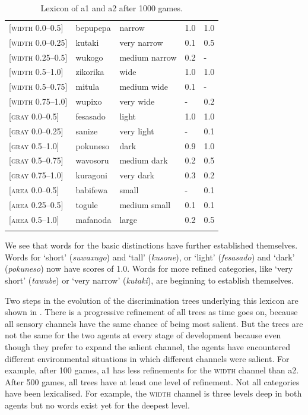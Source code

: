 \begin{table}
\begin{center}
\begin{tabular}{ l  l  l  l  l }
\lsptoprule
{}[\textsc{width} 0.0–0.5]&bepupepa&narrow & 1.0&1.0\\ 
{}[\textsc{width} 0.0–0.25]&kutaki&very narrow & 0.1&0.5\\ 
{}[\textsc{width} 0.25–0.5]&wukogo&medium narrow & 0.2&-\\ 
{}[\textsc{width} 0.5–1.0]&zikorika&wide & 1.0&1.0\\ 
{}[\textsc{width} 0.5–0.75]&mitula&medium wide &0.1&-\\ 
{}[\textsc{width} 0.75–1.0]&wupixo&very wide & -&0.2\\ 
{}[\textsc{gray} 0.0–0.5]&fesasado&light & 1.0&1.0\\ 
{}[\textsc{gray} 0.0–0.25]&sanize&very light & -&0.1\\ 
{}[\textsc{gray} 0.5–1.0]&pokuneso&dark &0.9&1.0\\ 
{}[\textsc{gray} 0.5–0.75]&wavosoru&medium dark & 0.2&0.5\\ 
{}[\textsc{gray} 0.75–1.0]&kuragoni&very dark &0.3&0.2\\ 
{}[\textsc{area} 0.0–0.5]&babifewa&small & -&0.1\\ 
{}[\textsc{area} 0.25–0.5]&togule&medium small & 0.1&0.1\\ 
{}[\textsc{area} 0.5–1.0]&mafanoda&large & 0.2&0.5\\ 
\lspbottomrule
\end{tabular}
\caption{\label{tab:lex500b}Lexicon of {\bfshape  a1} and {\bfshape  a2} after 1000 games.}
\end{center}
\end{table}

We see that words for the basic distinctions have further established
themselves. Words for `short' (\emph{suwaxugo}) and `tall' (\emph{kusone}), or `light' (\emph{fesasado}) and `dark' (\emph{pokuneso}) now have scores of 1.0. Words for more refined categories, like `very short' (\emph{tawube}) or `very narrow' (\emph{kutaki}), are beginning to establish themselves.  

Two steps in the evolution of the discrimination trees
underlying this lexicon are shown in .
There is a progressive refinement 
of all trees as time goes on, 
because all sensory channels have the same chance
of being most salient. But the trees are not 
the same for the two agents at every stage
of development because even though they prefer to expand
the salient channel, the agents have encountered 
different environmental situations in which different
channels were salient. For example, after 100 
games, {\bfshape  a1} has less refinements for the 
\textsc{width} channel than {\bfshape  a2}. 
After 500 games, all trees 
have at least one level of refinement. Not all 
categories have been lexicalised. For example, the 
\textsc{width} channel is three levels deep in both 
agents but no words exist yet for the deepest 
level. 


